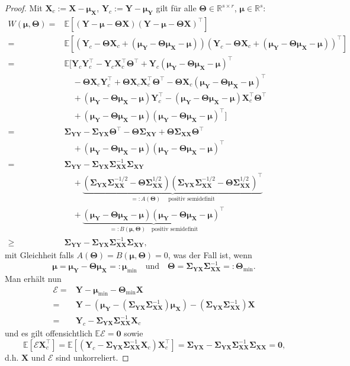 \documentclass[]{article}
\newcommand{\E}{\mathbb{E}}
\newcommand{\R}{\mathbb{R}}
\newcommand{\X}{\mathbf{X}}
\newcommand{\Y}{\mathbf{Y}}
\newcommand{\T}{\mathbf{\Theta}}
\newcommand{\muu}{\bm{\mu}}
\newcommand{\Ssigma}{\mathbf{\Sigma}}
\begin{document}
\begin{proof}
	Mit $\X_c := \X - \muu_\X$, $\Y_c := \Y - \muu_\Y$ gilt für alle $\T \in \R^{s \times r}$, $\muu \in \R^s$:
	\begin{align*}
		W(\muu, \T) ={}& \E[(\Y - \muu - \T \X)(\Y - \muu - \T \X)^\top] \\
		={}& \E[(\Y_c - \T \X_c + (\muu_\Y - \T \muu_\X - \muu))(\Y_c - \T \X_c + (\muu_\Y - \T \muu_\X - \muu))^\top] \\
		={}& \E[\Y_c \Y_c^\top - \Y_c \X_c^\top \T^\top + \Y_c (\muu_\Y - \T \muu_\X - \muu)^\top \\
		& \quad - \T \X_c \Y_c^\top + \T \X_c \X_c^\top \T^\top - \T \X_c (\muu_\Y - \T \muu_\X - \muu)^\top \\
		& \quad + (\muu_\Y - \T \muu_\X - \muu) \Y_c^\top - (\muu_\Y - \T \muu_\X - \muu) \X_c^\top \T^\top \\
		& \quad + (\muu_\Y - \T \muu_\X - \muu)(\muu_\Y - \T \muu_\X - \muu)^\top] \\
		={}& \Ssigma_{\Y\Y} - \Ssigma_{\Y\X} \T^\top - \T \Ssigma_{\X\Y} + \T \Ssigma_{\X\X} \T^\top \\
		& \quad + (\muu_\Y - \T \muu_\X - \muu)(\muu_\Y - \T \muu_\X - \muu)^\top \\
		={}& \Ssigma_{\Y\Y} - \Ssigma_{\Y\X} \Ssigma_{\X\X}^{-1} \Ssigma_{\X\Y} \\
		& \quad + \underbrace{(\Ssigma_{\Y\X} \Ssigma_{\X\X}^{-1/2} - \T \Ssigma_{\X\X}^{1/2})(\Ssigma_{\Y\X} \Ssigma_{\X\X}^{-1/2} - \T \Ssigma_{\X\X}^{1/2})^\top}_{=: A(\T) \quad \text{ positiv semidefinit}} \\
		& \quad + \underbrace{(\muu_\Y - \T \muu_\X - \muu)(\muu_\Y - \T \muu_\X - \muu)^\top}_{=:B(\muu, \T) \quad \text{positiv semidefinit}} \\
		\geq{}& \Ssigma_{\Y\Y} - \Ssigma_{\Y\X} \Ssigma_{\X\X}^{-1} \Ssigma_{\X\Y} \text{,}
	\end{align*}
	mit Gleichheit falls $A(\T) = B(\muu, \T) = 0$, was der Fall ist, wenn
	$$ \muu = \muu_\Y - \T \muu_\X =: \muu_{\min} \quad \text{und} \quad \T = \Ssigma_{\Y\X} \Ssigma_{\X\X}^{-1} =: \T_{\min} \text{.}$$
	Man erhält nun
	\begin{align*}
		\mathcal{E} ={}& \Y - \muu_{\min} - \T_{\min} \X \\
		={}& \Y - (\muu_\Y - (\Ssigma_{\Y\X} \Ssigma_{\X\X}^{-1}) \muu_\X) - (\Ssigma_{\Y\X} \Ssigma_{\X\X}^{-1}) \X \\
		={}& \Y_c - \Ssigma_{\Y\X} \Ssigma_{\X\X}^{-1} \X_c
	\end{align*}
	und es gilt offensichtlich $\E \mathcal{E} = \mathbf{0}$ sowie
	$$\E[\mathcal{E} \X_c^\top] = \E[(\Y_c - \Ssigma_{\Y\X} \Ssigma_{\X\X}^{-1} \X_c) \X_c^\top] = \Ssigma_{\Y\X} - \Ssigma_{\Y\X}\Ssigma_{\X\X}^{-1} \Ssigma_{\X\X} = \mathbf{0} \text{,}$$
	d.h. $\X$ und $\mathcal{E}$ sind unkorreliert.
\end{proof}
\end{document}
